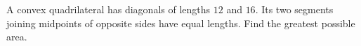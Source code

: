 A convex quadrilateral has diagonals of lengths $12$ and $16$. Its two segments joining midpoints of opposite sides have equal lengths. Find the greatest possible area.
